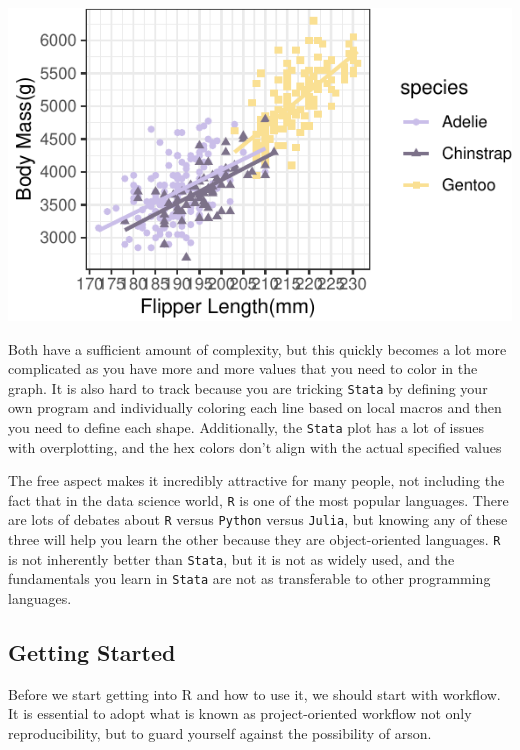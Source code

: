 \documentclass[]{tufte-handout}
\begin{document}
\begin{center}\includegraphics{R-Guide_files/figure-latex/manu-plot-1} \end{center}

Both have a sufficient amount of complexity, but this quickly becomes a
lot more complicated as you have more and more values that you need to
color in the graph. It is also hard to track because you are tricking
\texttt{Stata} by defining your own program and individually coloring
each line based on local macros and then you need to define each shape.
Additionally, the \texttt{Stata} plot has a lot of issues with
overplotting, and the hex colors don't align with the actual specified
values

The free aspect makes it incredibly attractive for many people, not
including the fact that in the data science world, \texttt{R} is one of
the most popular languages. There are lots of debates about \texttt{R}
versus \texttt{Python} versus \texttt{Julia}, but knowing any of these
three will help you learn the other because they are object-oriented
languages. \texttt{R} is not inherently better than \texttt{Stata}, but
it is not as widely used, and the fundamentals you learn in
\texttt{Stata} are not as transferable to other programming languages.

\hypertarget{getting-started}{%
\subsection{Getting Started}\label{getting-started}}

Before we start getting into R and how to use it, we should start with
workflow. It is essential to adopt what is known as project-oriented
workflow not only reproducibility, but to guard yourself against the
possibility of arson.
\end{document}
